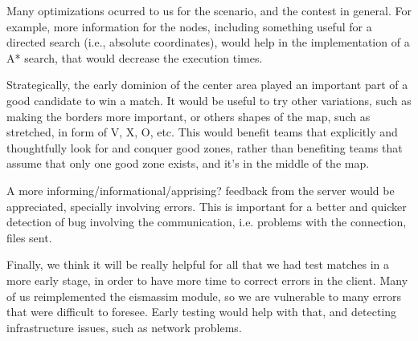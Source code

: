 \documentclass{llncs2e/llncs}
\begin{document}
    Many optimizations ocurred to us for the scenario, and the contest in general. 
    For example, more information for the nodes, including something useful for a 
    directed search (i.e., absolute coordinates), would help in the implementation 
    of a A* search, that would decrease the execution times.

    Strategically, the early dominion of the center area played an important part 
    of a good candidate to win a match. It would be useful to try other 
    variations, such as making the borders more important, or others shapes of the 
    map, such as stretched, in form of V, X, O, etc. This would benefit teams that 
    explicitly and thoughtfully look for and conquer good zones, rather than 
    benefiting teams that assume that only one good zone exists, and it's in the 
    middle of the map.

    A more informing/informational/apprising? feedback from the server would be 
    appreciated, specially involving errors. This is important for a better and 
    quicker detection of bug involving the communication, i.e. problems with the 
    connection, files sent.

    Finally, we think it will be really helpful for all that we had test matches 
    in a more early stage, in order to have more time to correct errors in the 
    client. Many of us reimplemented the eismassim module, so we are vulnerable to 
    many errors that were difficult to foresee. Early testing would help with 
    that, and detecting infrastructure issues, such as network problems.
    
    

    
 
 
\end{document}
